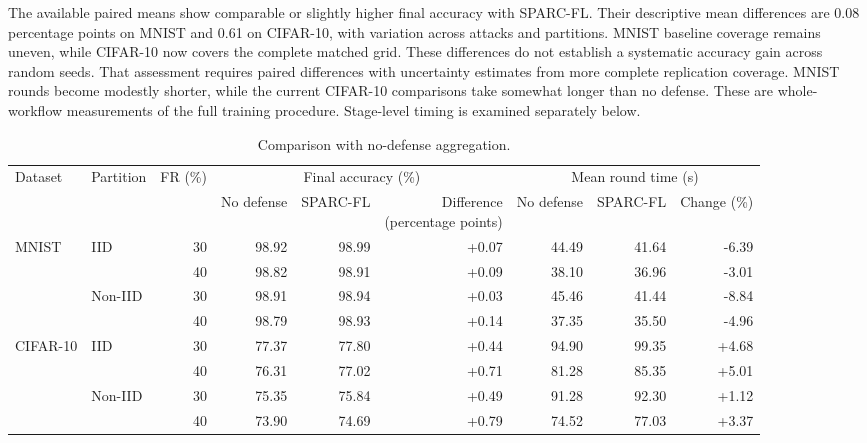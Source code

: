\documentclass[journal]{IEEEtran}
\begin{document}
The available paired means show comparable or slightly higher final
accuracy with SPARC-FL. Their descriptive mean differences are
0.08 percentage points on MNIST and 0.61
on CIFAR-10, with variation across attacks and partitions. MNIST baseline
coverage remains uneven, while CIFAR-10 now covers the complete matched
grid. These differences do not establish a systematic accuracy gain
across random seeds. That assessment requires paired differences with
uncertainty estimates from more complete replication coverage.
MNIST rounds become modestly shorter, while the current CIFAR-10
comparisons take somewhat longer than no defense. These are whole-workflow
measurements of the full training procedure. Stage-level timing is
examined separately below.

\begin{table}[t]\centering\footnotesize\setlength{\tabcolsep}{5pt}
\caption{Comparison with no-defense aggregation.}\label{tab:baseline}
\begin{tabular}{llrrrrrrr}\toprule
\multirow{2}{*}{Dataset} & \multirow{2}{*}{Partition} & \multirow{2}{*}{FR (\%)} & \multicolumn{3}{c}{Final accuracy (\%)} & \multicolumn{3}{c}{Mean round time (s)} \\
\cmidrule(lr){4-6}\cmidrule(lr){7-9}
& & & No defense & SPARC-FL & \shortstack{Difference\\(percentage points)} & No defense & SPARC-FL & Change (\%) \\ \midrule
\multirow{4}{*}{MNIST} & \multirow{2}{*}{IID} & 30 & 98.92 & 98.99 & +0.07 & 44.49 & 41.64 & -6.39 \\
 &  & 40 & 98.82 & 98.91 & +0.09 & 38.10 & 36.96 & -3.01 \\
\cmidrule(lr){2-9}
 & \multirow{2}{*}{Non-IID} & 30 & 98.91 & 98.94 & +0.03 & 45.46 & 41.44 & -8.84 \\
 &  & 40 & 98.79 & 98.93 & +0.14 & 37.35 & 35.50 & -4.96 \\
\midrule
\multirow{4}{*}{CIFAR-10} & \multirow{2}{*}{IID} & 30 & 77.37 & 77.80 & +0.44 & 94.90 & 99.35 & +4.68 \\
 &  & 40 & 76.31 & 77.02 & +0.71 & 81.28 & 85.35 & +5.01 \\
\cmidrule(lr){2-9}
 & \multirow{2}{*}{Non-IID} & 30 & 75.35 & 75.84 & +0.49 & 91.28 & 92.30 & +1.12 \\
 &  & 40 & 73.90 & 74.69 & +0.79 & 74.52 & 77.03 & +3.37 \\
\bottomrule\end{tabular}\end{table}
\end{document}
